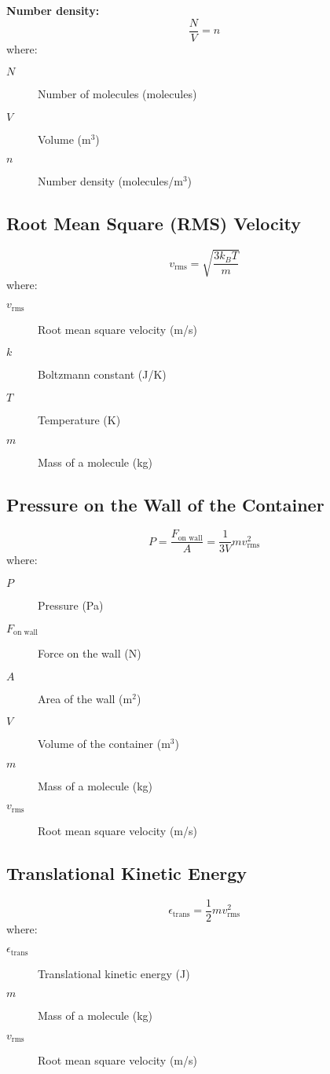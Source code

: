 \documentclass{article}
\begin{document}
\textbf{Number density:}
\begin{equation}
\frac{N}{V} = n
\end{equation}
where:
\begin{description}
    \item[$N$] Number of molecules (molecules)
    \item[$V$] Volume (m\(^3\))
    \item[$n$] Number density (molecules/m\(^3\))
\end{description}

\subsection*{Root Mean Square (RMS) Velocity}
\begin{equation}
    v_{\text{rms}} = \sqrt{\frac{3k_B T}{m}}
    \end{equation}
where:
\begin{description}
    \item[$v_{\text{rms}}$] Root mean square velocity (m/s)
    \item[$k$] Boltzmann constant (J/K)
    \item[$T$] Temperature (K)
    \item[$m$] Mass of a molecule (kg)
\end{description}


\subsection*{Pressure on the Wall of the Container}
\begin{equation}
P = \frac{F_{\text{on wall}}}{A} = \frac{1}{3V} m v_{\text{rms}}^2
\end{equation}
where:
\begin{description}
    \item[$P$] Pressure (Pa)
    \item[$F_{\text{on wall}}$] Force on the wall (N)
    \item[$A$] Area of the wall (m\(^2\))
    \item[$V$] Volume of the container (m\(^3\))
    \item[$m$] Mass of a molecule (kg)
    \item[$v_{\text{rms}}$] Root mean square velocity (m/s)
\end{description}

\subsection*{Translational Kinetic Energy}
\begin{equation}
\epsilon_{\text{trans}} = \frac{1}{2} m v_{\text{rms}}^2
\end{equation}
where:
\begin{description}
    \item[$\epsilon_{\text{trans}}$] Translational kinetic energy (J)
    \item[$m$] Mass of a molecule (kg)
    \item[$v_{\text{rms}}$] Root mean square velocity (m/s)
\end{description}
\end{document}
